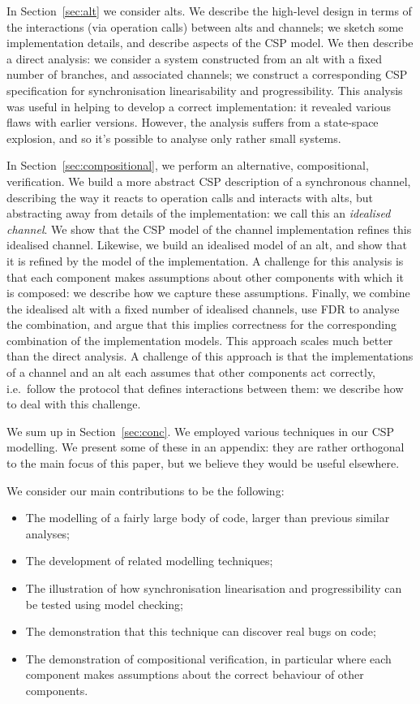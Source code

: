 In Section~\ref{sec:alt} we consider alts.  We describe the high-level design
in terms of the interactions (via operation calls) between alts and channels;
we  sketch some implementation details, and describe aspects of the CSP
model.  We then describe a direct analysis: we consider a system constructed
from an alt with a fixed number of branches, and associated channels; we
construct a corresponding CSP specification for synchronisation
linearisability and progressibility.  This analysis was useful in helping to
develop a correct implementation: it revealed various flaws with earlier
versions.  However, the analysis suffers from a state-space explosion, and so
it's possible to analyse only rather small systems.

In Section~\ref{sec:compositional}, we perform an alternative, compositional,
verification.  We build a more abstract CSP description of a synchronous
channel, describing the way it reacts to operation calls and interacts with
alts, but abstracting away from details of the implementation: we call this an
\emph{idealised channel}.  We show that the CSP model of the channel
implementation refines this idealised channel.  Likewise, we build an
idealised model of an alt, and show that it is refined by the model of the
implementation.  A challenge for this analysis is that each component makes
assumptions about other components with which it is composed: we describe how
we capture these assumptions.  Finally, we combine the idealised alt with a
fixed number of idealised channels, use FDR to analyse the combination, and
argue that this implies correctness for the corresponding combination of the
implementation models.  This approach scales much better than the direct
analysis.  A challenge of this approach is that the implementations of a
channel and an alt each assumes that other components act correctly,
i.e.~follow the protocol that defines interactions between them: we describe
how to deal with this challenge.

We sum up in Section~\ref{sec:conc}.
%
We employed various techniques in our CSP modelling.  We present some of these
in an appendix: they are rather orthogonal to the main focus of this paper,
but we believe they would be useful elsewhere.

We consider our main contributions to be the following:
%
\begin{itemize}
\item The modelling of a fairly large body of code, larger than previous
  similar analyses;

\item The development of related modelling techniques;

\item The illustration of how synchronisation linearisation and
  progressibility can be tested using model checking;

\item The demonstration that this technique can discover real bugs on code;

\item The demonstration of compositional verification, in particular where
  each component makes assumptions about the correct behaviour of other
  components. 
\end{itemize}


